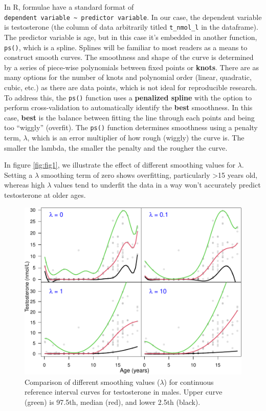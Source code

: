 \documentclass[]{elsarticle} %
\begin{document}
In R, formulae have a standard format of
\texttt{dependent\ variable\ \textasciitilde{}\ predictor\ variable}. In
our case, the dependent variable is testosterone (the column of data
arbitrarily titled \texttt{t\_nmol\_l} in the dataframe). The predictor
variable is age, but in this case it's embedded in another function,
\texttt{ps()}, which is a spline. Splines will be familiar to most
readers as a means to construct smooth curves. The smoothness and shape
of the curve is determined by a series of piece-wise polynomials between
fixed points or \textbf{knots}. There are as many options for the number
of knots and polynomial order (linear, quadratic, cubic, etc.) as there
are data points, which is not ideal for reproducible research. To
address this, the \texttt{ps()} function uses a \textbf{penalized
spline} with the option to perform cross-validation to automatically
identify the \textbf{best} smoothness. In this case, \textbf{best} is
the balance between fitting the line through each points and being too
``wiggly'' (overfit). The \texttt{ps()} function determines smoothness
using a penalty term, \(\lambda\), which is an error multiplier of how
rough (wiggly) the curve is. The smaller the lambda, the smaller the
penalty and the rougher the curve.

In figure \ref{fig:fig1}, we illustrate the effect of different
smoothing values for \(\lambda\). Setting a \(\lambda\) smoothing term
of zero shows overfitting, particularly \textgreater15 years old,
whereas high \(\lambda\) values tend to underfit the data in a way won't
accurately predict testosterone at older ages.

\begin{figure}[H]
\includegraphics{smoothingfi1-1} \caption{\label{fig:fig1}Comparison of different smoothing values ($\lambda$) for continuous reference interval curves for testosterone in males. Upper curve (green) is 97.5th, median (red), and lower 2.5th (black).}\label{fig:smoothingfi1}
\end{figure}
\end{document}
